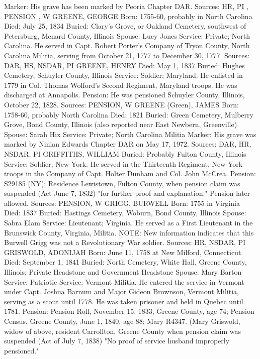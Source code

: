 Marker: His grave has been marked by Peoria Chapter DAR. 
Sources: HR, PI , PENSION , W 
GREENE, GEORGE 
Born: 1755-60, probably in North Carolina 
Died: July 25, 1834 
Buried: Clary's Grove, or Oakland Cemetery, southwest of Petersburg, Menard County, Illinois 
Spouse: Lucy Jones 
Service: Private; North Carolina. He served in Capt. Robert Porter's Company of Tryon County, North Carolina Militia, serving from October 21, 1777 to December 30, 1777. 
Sources: DAR, HS, NSDAR, PI 
GREENE, HENRY 
Died: May 1, 1837 
Buried: Hughes Cemetery, Schuyler County, Illinois 
Service: Soldier; Maryland. He enlisted in 1779 in Col. Thomas Wolford's Second Regiment, Maryland troops. He was discharged at Annapolis. 
Pension: He was pensioned Schuyler County, Illinois, October 22, 1828. 
Sources: PENSION, W 
GREENE (Green), JAMES 
Born: 1758-60, probably North Carolina 
Died: 1821
Buried: Green Cemetery, Mulberry Grove, Bond County, Illinois (also reported near East Newbern, Greenville) 
Spouse: Sarah Hix 
Service: Private; North Carolina Militia 
Marker: His grave was marked by Ninian Edwards Chapter DAR on May 17, 1972. 
Sources: DAR, HR, NSDAR, PI 
GRIFFITHS, WILLIAM 
Buried: Probably Fulton County, Illinois 
Service: Soldier; New York. He served in the Thirteenth Regiment, New York troops in the Company of Capt. Holter Dunham and Col. John McCrea. 
Pension: S29185 (NY); Residence Lewistown, Fulton County, when pension claim was suspended (Act June 7, 1832) "for further proof and explanation." Pen­sion later allowed. 
Sources: PENSION, W 
GRIGG, BURWELL 
Born: 1755 in Virginia 
Died: 1837 
Buried: Hastings Cemetery, Woburn, Bond County, Illinois 
Spouse: Sabra Elam 
Service: Lieutenant; Virginia. He served as a First Lieutenant in the Brunswick County, Virginia, Militia. NOTE: New information indicates that this Burwell Grigg was not a Revo­lutionary War soldier. 
Sources: HR, NSDAR, PI 
GRISWOLD, ADONIJAH 
Born: June 11, 1758 at New Milford, Connecticut 
Died: September 1, 1841 
Buried: North Cemetery, White Hall, Greene County, Illinois; Private Headstone and Government Headstone 
Spouse: Mary Barton 
Service: Patriotic 
Service: Vermont Militia. He entered the service in Vermont under Capt. Joshua Barnum and Major Gideon Brownson, Vermont Militia, serving as a scout until 1778. He was taken prisoner and held in Quebec until 1781. 
Pension: Pension Roll, November 15, 1833, Greene County, age 74; Pension Cen­sus, Greene County, June 1, 1840, age 88; Mary R4347. (Mary Griswold, widow of above, resident Carrollton, Greene County when pension claim was suspended (Act of July 7, 1838) "No proof of service ­husband improperly pensioned." 
